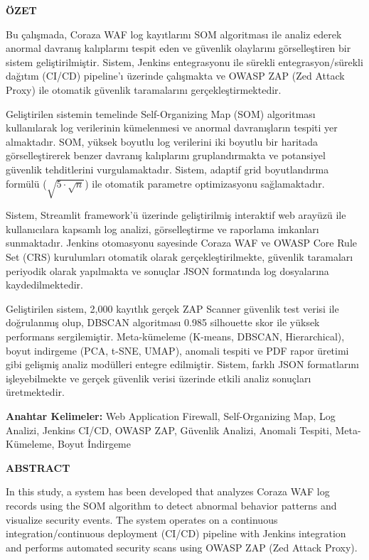 \newpage
\begin{center}
\large \textbf{ÖZET}
\end{center}

Bu çalışmada, Coraza WAF log kayıtlarını SOM algoritması ile analiz ederek anormal davranış kalıplarını tespit eden ve güvenlik olaylarını görselleştiren bir sistem geliştirilmiştir. Sistem, Jenkins entegrasyonu ile sürekli entegrasyon/sürekli dağıtım (CI/CD) pipeline'ı üzerinde çalışmakta ve OWASP ZAP (Zed Attack Proxy) ile otomatik güvenlik taramalarını gerçekleştirmektedir.

Geliştirilen sistemin temelinde Self-Organizing Map (SOM) algoritması kullanılarak log verilerinin kümelenmesi ve anormal davranışların tespiti yer almaktadır. SOM, yüksek boyutlu log verilerini iki boyutlu bir haritada görselleştirerek benzer davranış kalıplarını gruplandırmakta ve potansiyel güvenlik tehditlerini vurgulamaktadır. Sistem, adaptif grid boyutlandırma formülü ($\sqrt{5 \cdot \sqrt{n}}$) ile otomatik parametre optimizasyonu sağlamaktadır.

Sistem, Streamlit framework'ü üzerinde geliştirilmiş interaktif web arayüzü ile kullanıcılara kapsamlı log analizi, görselleştirme ve raporlama imkanları sunmaktadır. Jenkins otomasyonu sayesinde Coraza WAF ve OWASP Core Rule Set (CRS) kurulumları otomatik olarak gerçekleştirilmekte, güvenlik taramaları periyodik olarak yapılmakta ve sonuçlar JSON formatında log dosyalarına kaydedilmektedir.

Geliştirilen sistem, 2,000 kayıtlık gerçek ZAP Scanner güvenlik test verisi ile doğrulanmış olup, DBSCAN algoritması 0.985 silhouette skor ile yüksek performans sergilemiştir. Meta-kümeleme (K-means, DBSCAN, Hierarchical), boyut indirgeme (PCA, t-SNE, UMAP), anomali tespiti ve PDF rapor üretimi gibi gelişmiş analiz modülleri entegre edilmiştir. Sistem, farklı JSON formatlarını işleyebilmekte ve gerçek güvenlik verisi üzerinde etkili analiz sonuçları üretmektedir.

\textbf{Anahtar Kelimeler:} Web Application Firewall, Self-Organizing Map, Log Analizi, Jenkins CI/CD, OWASP ZAP, Güvenlik Analizi, Anomali Tespiti, Meta-Kümeleme, Boyut İndirgeme

\newpage
\begin{center}
\large \textbf{ABSTRACT}
\end{center}

In this study, a system has been developed that analyzes Coraza WAF log records using the SOM algorithm to detect abnormal behavior patterns and visualize security events. The system operates on a continuous integration/continuous deployment (CI/CD) pipeline with Jenkins integration and performs automated security scans using OWASP ZAP (Zed Attack Proxy).

